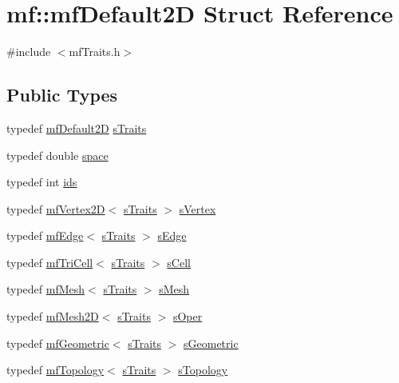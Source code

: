 \hypertarget{structmf_1_1mfDefault2D}{
\section{mf::mfDefault2D Struct Reference}
\label{structmf_1_1mfDefault2D}
}


{\ttfamily \#include $<$mfTraits.h$>$}

\subsection*{Public Types}
\begin{DoxyCompactItemize}
\item 
typedef \hyperlink{structmf_1_1mfDefault2D}{mfDefault2D} \hyperlink{structmf_1_1mfDefault2D_a8139211f36d360a0221d3a8e8221bbce}{sTraits}
\item 
typedef double \hyperlink{structmf_1_1mfDefault2D_adb9cddf677f4712bef5bfcb90f64d2f9}{space}
\item 
typedef int \hyperlink{structmf_1_1mfDefault2D_a0c23cfe375bcd646eed0501ca539127d}{ids}
\item 
typedef \hyperlink{classmf_1_1mfVertex2D}{mfVertex2D}$<$ \hyperlink{structmf_1_1mfDefault2D}{sTraits} $>$ \hyperlink{structmf_1_1mfDefault2D_a427f10d57187e5fe16a2b3ae91d18ea2}{sVertex}
\item 
typedef \hyperlink{classmf_1_1mfEdge}{mfEdge}$<$ \hyperlink{structmf_1_1mfDefault2D}{sTraits} $>$ \hyperlink{structmf_1_1mfDefault2D_aee1699c9233b1e9b0461258cda97dd95}{sEdge}
\item 
typedef \hyperlink{classmf_1_1mfTriCell}{mfTriCell}$<$ \hyperlink{structmf_1_1mfDefault2D}{sTraits} $>$ \hyperlink{structmf_1_1mfDefault2D_a00494a3737ff059da660e6b2448d85e7}{sCell}
\item 
typedef \hyperlink{classmf_1_1mfMesh}{mfMesh}$<$ \hyperlink{structmf_1_1mfDefault2D}{sTraits} $>$ \hyperlink{structmf_1_1mfDefault2D_a8d813cb3f2395cfcfeaa8bd4f9c5eade}{sMesh}
\item 
typedef \hyperlink{classmf_1_1mfMesh2D}{mfMesh2D}$<$ \hyperlink{structmf_1_1mfDefault2D}{sTraits} $>$ \hyperlink{structmf_1_1mfDefault2D_a62b4225279579e884393a540e2e628cb}{sOper}
\item 
typedef \hyperlink{classmf_1_1mfGeometric}{mfGeometric}$<$ \hyperlink{structmf_1_1mfDefault2D}{sTraits} $>$ \hyperlink{structmf_1_1mfDefault2D_a974a8a9297a6c7dbe28a3aae93ec0932}{sGeometric}
\item 
typedef \hyperlink{classmf_1_1mfTopology}{mfTopology}$<$ \hyperlink{structmf_1_1mfDefault2D}{sTraits} $>$ \hyperlink{structmf_1_1mfDefault2D_aa4faa97e437f812f5bad578e7862ce0f}{sTopology}
\end{DoxyCompactItemize}


